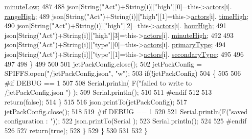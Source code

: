 \begin{DoxyCode}
      \hyperlink{struct_jetpack_1_1state_aa699e25d802a00e86d3a8032ec48b88b}{minuteLow};
487 
488                 json[String(\textcolor{stringliteral}{"Act"})+String(i)][\textcolor{stringliteral}{"high"}][0]=this->\hyperlink{class_jetpack_a7e16d2f97837f9712a2e6de1c50d99db}{actors}[i].
      \hyperlink{struct_jetpack_1_1state_ae330612c3da637654ecfa89d36620b93}{rangeHigh};
489                 json[String(\textcolor{stringliteral}{"Act"})+String(i)][\textcolor{stringliteral}{"high"}][1]=this->\hyperlink{class_jetpack_a7e16d2f97837f9712a2e6de1c50d99db}{actors}[i].
      \hyperlink{struct_jetpack_1_1state_a97c594b20b03b46ae0a6ac544f5d6c8d}{timeHigh};
490                 json[String(\textcolor{stringliteral}{"Act"})+String(i)][\textcolor{stringliteral}{"high"}][2]=this->\hyperlink{class_jetpack_a7e16d2f97837f9712a2e6de1c50d99db}{actors}[i].
      \hyperlink{struct_jetpack_1_1state_ace824f4ae57fa1a4a27b2c6477b350e3}{hourHigh};
491                 json[String(\textcolor{stringliteral}{"Act"})+String(i)][\textcolor{stringliteral}{"high"}][3]=this->\hyperlink{class_jetpack_a7e16d2f97837f9712a2e6de1c50d99db}{actors}[i].
      \hyperlink{struct_jetpack_1_1state_a8c26c18b0ec449b7545934cb01cca028}{minuteHigh};
492 
493                 json[String(\textcolor{stringliteral}{"Act"})+String(i)][\textcolor{stringliteral}{"type"}][0]=this->\hyperlink{class_jetpack_a7e16d2f97837f9712a2e6de1c50d99db}{actors}[i].
      \hyperlink{struct_jetpack_1_1state_aa6242c32eb0ab42aaea170636ab949e1}{primaryType};
494                 json[String(\textcolor{stringliteral}{"Act"})+String(i)][\textcolor{stringliteral}{"type"}][1]=this->\hyperlink{class_jetpack_a7e16d2f97837f9712a2e6de1c50d99db}{actors}[i].
      \hyperlink{struct_jetpack_1_1state_a81cf9af139da095b7d91e2a87e50135b}{secondaryType};
495 
496 
497 
498             \}
499             
500 
501             jetPackConfig.close();          
502             jetPackConfig = SPIFFS.open(\textcolor{stringliteral}{"/jetPackConfig.json"}, \textcolor{stringliteral}{"w"});            
503             \textcolor{keywordflow}{if}(!jetPackConfig)
504             \{
505             
506 \textcolor{preprocessor}{            #if DEBUG == 1 }
507 
508                 Serial.println( F(\textcolor{stringliteral}{"failed to write to /jetPackConfig.json "}) );
509                 Serial.println();
510             
511 \textcolor{preprocessor}{            #endif}
512                 
513                 \textcolor{keywordflow}{return}(\textcolor{keyword}{false});          
514             \}  
515 
516             json.printTo(jetPackConfig);
517             jetPackConfig.close();
518 
519 \textcolor{preprocessor}{        #if DEBUG == 1 }
520             
521             Serial.println(F(\textcolor{stringliteral}{"saved configuration : "}));
522             json.printTo(Serial );
523             Serial.println();       
524         
525 \textcolor{preprocessor}{        #endif}
526 
527             \textcolor{keywordflow}{return}(\textcolor{keyword}{true}); 
528         \}
529     \}   
530     
531 
532 \}
\end{DoxyCode}
